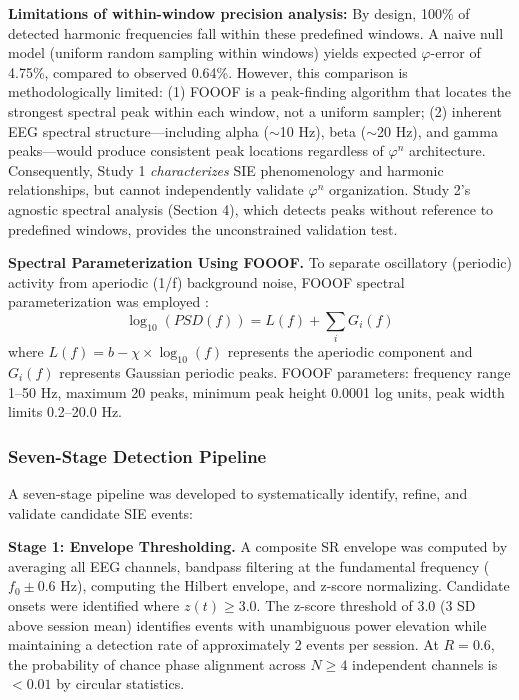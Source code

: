 \documentclass[11pt,a4paper]{article}
\newcommand{\phisym}{\varphi}
\begin{document}
\textbf{Limitations of within-window precision analysis:} By design, 100\% of detected harmonic frequencies fall within these predefined windows. A naive null model (uniform random sampling within windows) yields expected $\phisym$-error of 4.75\%, compared to observed 0.64\%. However, this comparison is methodologically limited: (1) FOOOF is a peak-finding algorithm that locates the strongest spectral peak within each window, not a uniform sampler; (2) inherent EEG spectral structure---including alpha ($\sim$10 Hz), beta ($\sim$20 Hz), and gamma peaks---would produce consistent peak locations regardless of $\phisym^n$ architecture. Consequently, Study 1 \textit{characterizes} SIE phenomenology and harmonic relationships, but cannot independently validate $\phisym^n$ organization. Study 2's agnostic spectral analysis (Section 4), which detects peaks without reference to predefined windows, provides the unconstrained validation test.

\textbf{Spectral Parameterization Using FOOOF.}
To separate oscillatory (periodic) activity from aperiodic (1/f) background noise, FOOOF spectral parameterization was employed \parencite{donoghue2020fooof}:
\begin{equation}
\log_{10}(PSD(f)) = L(f) + \sum_{i} G_{i}(f)
\end{equation}
where $L(f) = b - \chi \times \log_{10}(f)$ represents the aperiodic component and $G_i(f)$ represents Gaussian periodic peaks. FOOOF parameters: frequency range 1--50 Hz, maximum 20 peaks, minimum peak height 0.0001 log units, peak width limits 0.2--20.0 Hz.

\subsubsection{Seven-Stage Detection Pipeline}

A seven-stage pipeline was developed to systematically identify, refine, and validate candidate SIE events:

\textbf{Stage 1: Envelope Thresholding.}
A composite SR envelope was computed by averaging all EEG channels, bandpass filtering at the fundamental frequency ($f_0 \pm 0.6$ Hz), computing the Hilbert envelope, and z-score normalizing. Candidate onsets were identified where $z(t) \geq 3.0$. The z-score threshold of 3.0 (3 SD above session mean) identifies events with unambiguous power elevation while maintaining a detection rate of approximately 2 events per session. At $R = 0.6$, the probability of chance phase alignment across $N \geq 4$ independent channels is $< 0.01$ by circular statistics.
\end{document}

